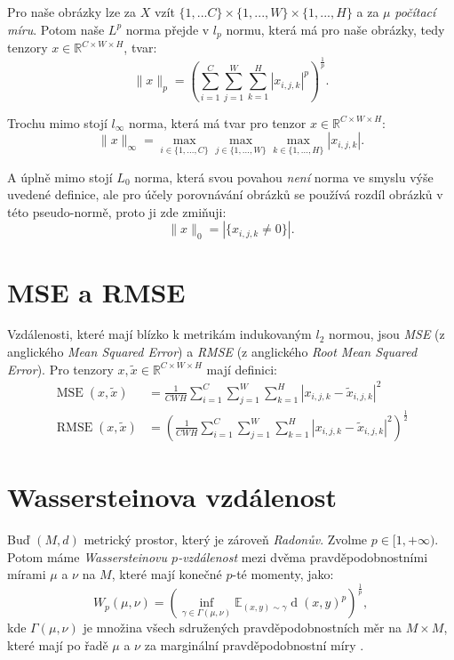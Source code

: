 \documentclass[czech]{article}
\begin{document}
Pro naše obrázky lze za $X$ vzít $\{1, ... C\} \times \{1, ..., W\} \times \{1, ..., H\}$ a za $\mu$ \emph{počítací míru}.
Potom naše $L^p$ norma přejde v $l_p$ normu, která má pro naše obrázky, tedy tenzory $x \in \mathbb{R}^{C \times W \times H}$, tvar:
\begin{equation}
    \|x\|_p = \left( \sum_{i=1}^{C} \sum_{j=1}^{W} \sum_{k=1}^{H} |x_{i, j, k}|^p \right)^{\frac{1}{p}}.
\end{equation}

Trochu mimo stojí $l_{\infty}$ norma, která má tvar pro tenzor $x \in \mathbb{R}^{C \times W \times H}$:
\begin{equation}
    \|x\|_\infty = \max_{i \in \{1, ..., C\}} \max_{j \in \{1, ..., W\}} \max_{k \in \{1, ..., H\}} |x_{i, j, k}|.
\end{equation}

A úplně mimo stojí $L_0$ norma, která svou povahou \emph{není} norma ve smyslu výše uvedené definice,
ale pro účely porovnávání obrázků se používá rozdíl obrázků v této pseudo-normě, proto ji zde zmiňuji:
\begin{equation}
    \|x\|_0 = |\{x_{i, j, k} \neq 0\}|.
\end{equation}

\section{MSE a RMSE}

Vzdálenosti, které mají blízko k metrikám indukovaným $l_2$ normou, jsou \emph{MSE} (z anglického \emph{Mean Squared Error})
a \emph{RMSE} (z anglického \emph{Root Mean Squared Error}).
Pro tenzory $x, \tilde{x} \in \mathbb{R}^{C \times W \times H}$ mají definici:
\begin{align}
    \operatorname{MSE}(x, \tilde{x}) &= \frac{1}{C W H} \sum_{i=1}^C \sum_{j=1}^W \sum_{k=1}^H | x_{i, j, k} - \tilde{x}_{i, j, k} |^2 \\
    \operatorname{RMSE}(x, \tilde{x}) &= \left(\frac{1}{C W H} \sum_{i=1}^C \sum_{j=1}^W \sum_{k=1}^H | x_{i, j, k} - \tilde{x}_{i, j, k} |^2 \right)^{\frac{1}{2}}
\end{align}

\section{Wassersteinova vzdálenost}

Buď $(M, d)$ metrický prostor, který je zároveň \emph{Radonův}. Zvolme $p \in [1, + \infty)$.
Potom máme \emph{Wassersteinovu $p$-vzdálenost} mezi dvěma pravděpodobnostními mírami $\mu$ a $\nu$ na $M$,
které mají konečné $p$-té momenty,
jako:
\begin{equation}
    W_p (\mu, \nu) = \left( \inf_{\gamma \in \Gamma(\mu, \nu)} \mathbb{E}_{(x, y) \sim \gamma} \operatorname{d}(x, y)^p \right)^{\frac{1}{p}},
\end{equation}
kde $\Gamma(\mu, \nu)$ je množina všech sdružených pravděpodobnostních měr na $M \times M$,
které mají po řadě $\mu$ a $\nu$ za marginální pravděpodobnostní míry \cite{vaserstejn}.
\end{document}
